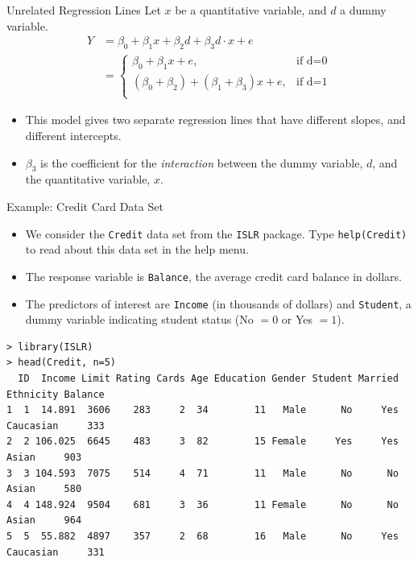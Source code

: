 \documentclass[10pt]{beamer}\usepackage[]{graphicx}\usepackage[]{color}
\begin{document}
\begin{frame}{Unrelated Regression Lines}
Let $x$ be a quantitative variable, and $d$ a dummy variable.\\

\begin{align*}
Y &= \beta_0 + \beta_1 x + \beta_2 d + \beta_3 d \cdot x + e\\ 
& = \begin{cases}
\beta_0 + \beta_1 x + e, & \text{if d=0}\\
(\beta_0 + \beta_2) + (\beta_1 + \beta_3) x + e, & \text{if d=1}\\
\end{cases}
\end{align*}

\begin{itemize}
\item This model gives two separate regression lines that have different slopes, and different intercepts.
\item $\beta_3$ is the coefficient for the \emph{interaction} between the dummy variable, $d$, and the quantitative variable, $x$.  
\end{itemize}
\end{frame}

\begin{frame}[fragile]{Example: Credit Card Data Set}
\begin{itemize}
\item We consider the \texttt{Credit} data set from the \texttt{ISLR} package.  Type \texttt{help(Credit)} to read about this data set in the help menu.\\
\vspace{5pt}
\item The response variable is \texttt{Balance}, the average credit card balance in dollars.\\
\vspace{5pt}
\item The predictors of interest are \texttt{Income} (in thousands of dollars) and \texttt{Student}, a dummy variable indicating student status (No $=0$ or Yes $=1$).
\end{itemize}
\scriptsize
\begin{verbatim}
> library(ISLR)
> head(Credit, n=5)
  ID  Income Limit Rating Cards Age Education Gender Student Married Ethnicity Balance
1  1  14.891  3606    283     2  34        11   Male      No     Yes Caucasian     333
2  2 106.025  6645    483     3  82        15 Female     Yes     Yes     Asian     903
3  3 104.593  7075    514     4  71        11   Male      No      No     Asian     580
4  4 148.924  9504    681     3  36        11 Female      No      No     Asian     964
5  5  55.882  4897    357     2  68        16   Male      No     Yes Caucasian     331
\end{verbatim}
\end{frame}
\end{document}
